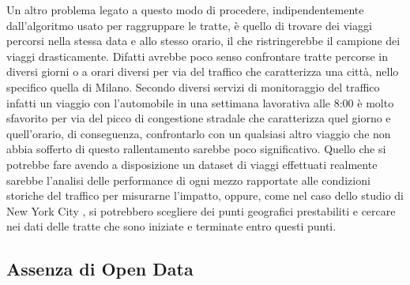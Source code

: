 Un altro problema legato a questo modo di procedere, indipendentemente dall'algoritmo usato per raggruppare le tratte, è quello di trovare dei viaggi percorsi nella stessa data e allo stesso orario, il che ristringerebbe il campione dei viaggi drasticamente. Difatti avrebbe poco senso confrontare tratte percorse in diversi giorni o a orari diversi per via del traffico che caratterizza una città, nello specifico quella di Milano. Secondo diversi servizi di monitoraggio del traffico infatti un viaggio con l'automobile in una settimana lavorativa alle 8:00 è molto sfavorito per via del picco di congestione stradale che caratterizza quel giorno e quell'orario, di conseguenza, confrontarlo con un qualsiasi altro viaggio che non abbia sofferto di questo rallentamento sarebbe poco significativo. Quello che si potrebbe fare avendo a disposizione un dataset di viaggi effettuati realmente sarebbe l'analisi delle performance di ogni mezzo rapportate alle condizioni storiche del traffico per misurarne l'impatto, oppure, come nel caso dello studio di New York City \cite{faghih2017hail}, si potrebbero scegliere dei punti geografici prestabiliti e cercare nei dati delle tratte che sono iniziate e terminate entro questi punti.

\subsection{Assenza di Open Data}

